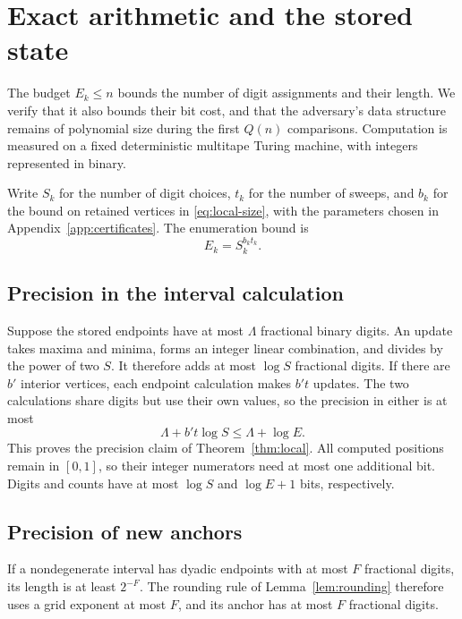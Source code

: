 \section{Exact arithmetic and the stored state}\label{app:arithmetic}

The budget $E_k\le n$ bounds the number of digit assignments and their
length. We verify that it also bounds their bit cost, and that the
adversary's data structure remains of polynomial size during the first
$Q(n)$ comparisons.
Computation is measured on a fixed deterministic multitape Turing
machine, with integers represented in binary.

Write $S_k$ for the number of digit choices, $t_k$ for the number of
sweeps, and $b_k$ for the bound on retained vertices in
\eqref{eq:local-size}, with the parameters chosen in
Appendix~\ref{app:certificates}. The enumeration bound is
\begin{equation}\label{eq:enumeration-budget}
E_k=S_k^{b_k t_k}.
\end{equation}

\subsection{Precision in the interval calculation}\label{sec:digit-arithmetic}

Suppose the stored endpoints have at most $\Lambda$ fractional binary
digits. An update takes maxima and minima, forms an integer linear
combination, and divides by the power of two $S$. It therefore adds at
most $\log S$ fractional digits. If there are $b'$ interior vertices,
each endpoint calculation makes $b't$ updates. The two calculations share
digits but use their own values, so the precision in either is at most
\begin{equation}\label{eq:digit-precision}
\Lambda+b't\log S\le\Lambda+\log E.
\end{equation}
This proves the precision claim of Theorem~\ref{thm:local}. All computed
positions remain in $[0,1]$, so their integer numerators need at most one
additional bit. Digits and counts have at most $\log S$ and $\log E+1$
bits, respectively.

\subsection{Precision of new anchors}

If a nondegenerate interval has dyadic endpoints with at most $F$
fractional digits, its length is at least $2^{-F}$. The rounding rule
of Lemma~\ref{lem:rounding} therefore uses a grid exponent at most $F$,
and its anchor has at most $F$ fractional digits.

